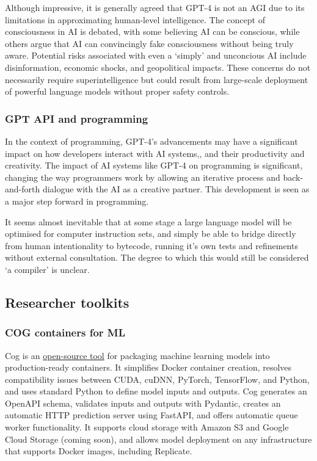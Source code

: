 Although impressive, it is generally agreed that GPT-4 is not an AGI due to its limitations in approximating human-level intelligence. The concept of consciousness in AI is debated, with some believing AI can be conscious, while others argue that AI can convincingly fake consciousness without being truly aware. Potential risks associated with even a `simply' and unconcious AI include disinformation, economic shocks, and geopolitical impacts. These concerns do not necessarily require superintelligence but could result from large-scale deployment of powerful language models without proper safety controls.
\subsubsection{GPT API and programming}
In the context of programming, GPT-4's advancements may have a significant impact on how developers interact with AI systems,, and their productivity and creativity. The impact of AI systems like GPT-4 on programming is significant, changing the way programmers work by allowing an iterative process and back-and-forth dialogue with the AI as a creative partner. This development is seen as a major step forward in programming.\par 
It seems almost inevitable that at some stage a large language model will be optimised for computer instruction sets,   and simply be able to bridge directly from human intentionality to bytecode, running it's own tests and refinements without external consultation. The degree to which this would still be considered `a compiler' is unclear.
\subsection{Researcher toolkits}
\subsubsection{COG containers for ML}
Cog is an \href{https://github.com/replicate/cog}{open-source tool} for packaging machine learning models into production-ready containers. It simplifies Docker container creation, resolves compatibility issues between CUDA, cuDNN, PyTorch, TensorFlow, and Python, and uses standard Python to define model inputs and outputs. Cog generates an OpenAPI schema, validates inputs and outputs with Pydantic, creates an automatic HTTP prediction server using FastAPI, and offers automatic queue worker functionality. It supports cloud storage with Amazon S3 and Google Cloud Storage (coming soon), and allows model deployment on any infrastructure that supports Docker images, including Replicate.
